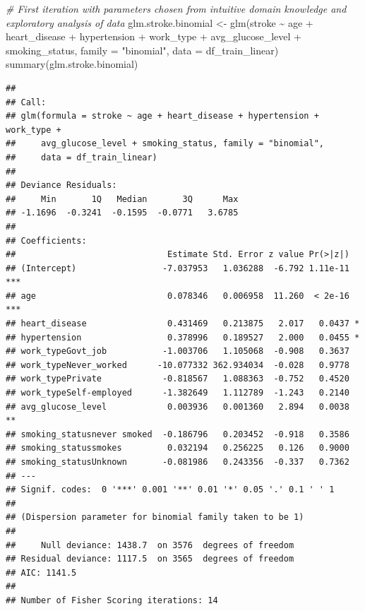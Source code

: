 \documentclass[
]{article}
\newenvironment{Shaded}{\begin{snugshade}}{\end{snugshade}}
\newcommand{\AttributeTok}[1]{\textcolor[rgb]{0.77,0.63,0.00}{#1}}
\newcommand{\CommentTok}[1]{\textcolor[rgb]{0.56,0.35,0.01}{\textit{#1}}}
\newcommand{\FunctionTok}[1]{\textcolor[rgb]{0.00,0.00,0.00}{#1}}
\newcommand{\NormalTok}[1]{#1}
\newcommand{\OtherTok}[1]{\textcolor[rgb]{0.56,0.35,0.01}{#1}}
\newcommand{\SpecialCharTok}[1]{\textcolor[rgb]{0.00,0.00,0.00}{#1}}
\newcommand{\StringTok}[1]{\textcolor[rgb]{0.31,0.60,0.02}{#1}}
\renewcommand{\=}[1]{\stackrel{#1}{=}}
\theoremstyle{definition}
\theoremstyle{remark}
\begin{document}
\begin{Shaded}
\begin{Highlighting}[]
\CommentTok{\# First iteration with parameters chosen from intuitive domain knowledge and exploratory analysis of data}
\NormalTok{glm.stroke.binomial }\OtherTok{\textless{}{-}} \FunctionTok{glm}\NormalTok{(stroke }\SpecialCharTok{\textasciitilde{}}\NormalTok{ age }\SpecialCharTok{+}\NormalTok{ heart\_disease }\SpecialCharTok{+}\NormalTok{ hypertension }\SpecialCharTok{+}\NormalTok{ work\_type }\SpecialCharTok{+}\NormalTok{ avg\_glucose\_level }\SpecialCharTok{+}\NormalTok{ smoking\_status,}
\AttributeTok{family =} \StringTok{"binomial"}\NormalTok{,}
\AttributeTok{data =}\NormalTok{ df\_train\_linear)}
\FunctionTok{summary}\NormalTok{(glm.stroke.binomial)}
\end{Highlighting}
\end{Shaded}

\begin{verbatim}
## 
## Call:
## glm(formula = stroke ~ age + heart_disease + hypertension + work_type + 
##     avg_glucose_level + smoking_status, family = "binomial", 
##     data = df_train_linear)
## 
## Deviance Residuals: 
##     Min       1Q   Median       3Q      Max  
## -1.1696  -0.3241  -0.1595  -0.0771   3.6785  
## 
## Coefficients:
##                              Estimate Std. Error z value Pr(>|z|)    
## (Intercept)                 -7.037953   1.036288  -6.792 1.11e-11 ***
## age                          0.078346   0.006958  11.260  < 2e-16 ***
## heart_disease                0.431469   0.213875   2.017   0.0437 *  
## hypertension                 0.378996   0.189527   2.000   0.0455 *  
## work_typeGovt_job           -1.003706   1.105068  -0.908   0.3637    
## work_typeNever_worked      -10.077332 362.934034  -0.028   0.9778    
## work_typePrivate            -0.818567   1.088363  -0.752   0.4520    
## work_typeSelf-employed      -1.382649   1.112789  -1.243   0.2140    
## avg_glucose_level            0.003936   0.001360   2.894   0.0038 ** 
## smoking_statusnever smoked  -0.186796   0.203452  -0.918   0.3586    
## smoking_statussmokes         0.032194   0.256225   0.126   0.9000    
## smoking_statusUnknown       -0.081986   0.243356  -0.337   0.7362    
## ---
## Signif. codes:  0 '***' 0.001 '**' 0.01 '*' 0.05 '.' 0.1 ' ' 1
## 
## (Dispersion parameter for binomial family taken to be 1)
## 
##     Null deviance: 1438.7  on 3576  degrees of freedom
## Residual deviance: 1117.5  on 3565  degrees of freedom
## AIC: 1141.5
## 
## Number of Fisher Scoring iterations: 14
\end{verbatim}
\end{document}
